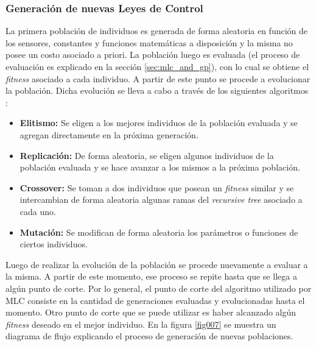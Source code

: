 \documentclass[a4paper,10pt]{article}
\begin{document}
    \subsubsection{Generación de nuevas Leyes de Control} \label{sec:law_gen}
        \indent La primera población de individuos es generada de forma aleatoria en función de los sensores, constantes y funciones
        matemáticas a disposición y la misma no posee un costo asociado a priori. La población luego es evaluada (el proceso de evaluación
        es explicado en la sección \ref{sec:mlc_and_gp}), con lo cual se obtiene el \textit{fitness} asociado a cada individuo. A partir de
        este punto se procede a evolucionar la población. Dicha evolución se lleva a cabo a través de los siguientes algoritmos
        \cite{Duriez2016}:

        \begin{itemize}
            \item \textbf{Elitismo:} Se eligen a los mejores individuos de la población evaluada y se agregan directamente en la próxima
            generación.
            \item \textbf{Replicación:} De forma aleatoria, se eligen algunos individuos de la población evaluada y se hace avanzar a los
            mismos a la próxima población.
        \item \textbf{Crossover:} Se toman a dos individuos que posean un \textit{fitness} similar y se intercambian de forma aleatoria
            algunas ramas del \textit{recursive tree} asociado a cada uno.
            \item \textbf{Mutación:} Se modifican de forma aleatoria los parámetros o funciones de ciertos individuos.
        \end{itemize}

        Luego de realizar la evolución de la población se procede nuevamente a evaluar a la misma. A partir de este momento, ese proceso
        se repite hasta que se llega a algún punto de corte. Por lo general, el punto de corte del algoritmo utilizado por MLC consiste
        en la cantidad de generaciones evaluadas y evolucionadas hasta el momento. Otro punto de corte que se puede utilizar es haber
        alcanzado algún \textit{fitness} deseado en el mejor individuo. En la figura \ref{fig007} se muestra un diagrama de flujo
        explicando el proceso de generación de nuevas poblaciones.
\end{document}
